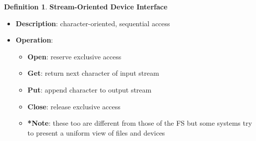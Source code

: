 \documentclass[11pt,a4paper]{article}
\theoremstyle{definition}
\newtheorem{definition}{Definition}[section]
\newenvironment{myitemize}
{ \begin{itemize}
    \setlength{\itemsep}{5pt}
    \setlength{\parskip}{0pt}
    \setlength{\parsep}{0pt}     }
{ \end{itemize}                  }
\begin{document}
\begin{definition}{\textbf{Stream-Oriented Device Interface}}
	\begin{myitemize}
		\item \textbf{Description}: character-oriented, sequential access
		\item \textbf{Operation}:
		\begin{myitemize}
			\item \textbf{Open}: reserve exclusive access
			\item \textbf{Get}: return next character of input stream
			\item \textbf{Put}: append character to output stream
			\item \textbf{Close}: release exclusive access
			\item \textbf{*Note}: these too are different from those of the FS but some systems try to present a uniform view of files and devices 
		\end{myitemize}
	\end{myitemize}
\end{definition}
\end{document}
